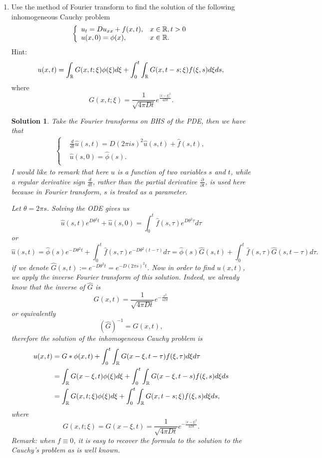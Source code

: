 \documentclass[6pt]{article}
\newtheorem{solution}{Solution}
\numberwithin{equation}{section}
\def\mathbb{\Bbb}
\begin{document}
\begin{enumerate}
\item Use the method of Fourier transform to find the solution of the following inhomogeneous Cauchy problem
\[
\left\{
\begin{array}{ll}
u_t=Du_{xx}+f(x,t),&x\in \mathbb R,t>0\\
u(x,0)=\phi(x),&x\in \mathbb R.
\end{array}
\right.
\]
 Hint:
 \[u(x,t)=\int_\mathbb R G(x,t;\xi)\phi(\xi)d\xi+\int_0^t\int_\mathbb R G(x,t-s;\xi)f(\xi,s)d\xi ds,  \]
where \[G(x,t;\xi)=\frac{1}{\sqrt{4\pi Dt}}e^\frac{\vert x-\xi\vert^2}{4Dt}.\]
\begin{solution}
Take the Fourier transforms on BHS of the PDE, then we have that
\begin{align*}
\begin{cases}
&\frac{d}{dt}\hat{u}(s,t)=D(2\pi is)^2\hat{u}(s,t)+\hat{f}(s,t),\\
&\hat{u}(s,0)=\hat{\phi}(s).\\
\end{cases}
\end{align*}
I would like to remark that here $u$ is a function of two variables $s$ and $t$, while a regular derivative sign $\frac{d}{dt}$, rather than the partial derivative $\frac{\partial}{\partial t}$, is used here because in Fourier transform, $s$ is treated as a parameter.

Let $\theta=2\pi s$.  Solving the ODE gives us
\[\hat{u}(s,t)e^{D\theta^2 t}+\hat{u}(s,0)=\int^t_0 \hat{f}(s,\tau)e^{D\theta^2 \tau}d\tau\]
or
\[\hat{u}(s,t)=\hat{\phi}(s)e^{-D\theta^2 t}+\int^t_0 \hat{f}(s,\tau)e^{-D\theta^2 (t-\tau)}d\tau=\hat{\phi}(s)\hat{G}(s,t)+\int^t_0 \hat{f}(s,\tau)\hat{G}(s,t-\tau)d\tau.\]
if we denote $\hat{G}(s,t):=e^{-D\theta^2 t}=e^{-D(2\pi s)^2 t}$.  Now in order to find $u(x,t)$, we apply the inverse Fourier transform of this solution.  Indeed, we already know that the inverse of $\hat G$ is
\[G(x,t)=\frac{1}{\sqrt{4\pi Dt}}e^{-\frac{x^2}{4Dt}}\]
or equivalently
\[(\hat G)^{-1}=G(x,t),\]
therefore the solution of the inhomogeneous Cauchy problem is
\begin{align*}
u(x,t)&=G\ast\phi (x,t)+ \int^t_0 \int_{\mathbb{R}}G(x-\xi,t-\tau)f(\xi,\tau)d\xi d\tau \\
&=\int_{\mathbb{R}}G(x-\xi,t)\phi(\xi)d\xi+\int^t_0 \int_{\mathbb{R}}G(x-\xi,t-s)f(\xi,s)d\xi ds \\
&=\int_\mathbb R G(x,t;\xi)\phi(\xi)d\xi+\int_0^t\int_\mathbb R G(x,t-s;\xi)f(\xi,s)d\xi ds,
\end{align*}
where
\[G(x,t;\xi)=G(x-\xi,t)=\frac{1}{\sqrt{4\pi Dt}}e^{-\frac{\vert x-\xi\vert^2}{4Dt}}.\]
Remark: when $f\equiv 0$, it is easy to recover the formula to the solution to the Cauchy's problem as is well known.
\end{solution}


\end{enumerate}
\end{document}
